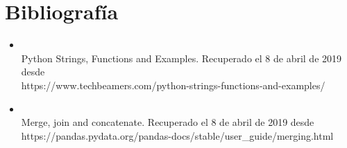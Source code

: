 \documentclass[letterpaper,12pt]{article}
\begin{document}
\section*{Bibliografía}
\begin{itemize}

\item \\Python Strings, Functions and Examples. Recuperado el 8 de abril de 2019 desde \\https://www.techbeamers.com/python-strings-functions-and-examples/
\\

\item \\Merge, join and concatenate. Recuperado el 8 de abril de 2019 desde \\https://pandas.pydata.org/pandas-docs/stable/user\_guide/merging.html
\end{itemize}
\end{document}
